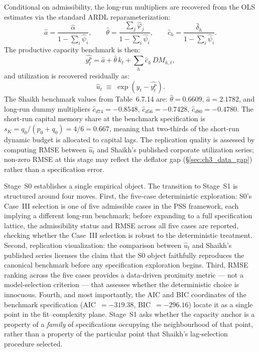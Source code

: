 \documentclass[11pt,a4paper]{article}
\begin{document}
Conditional on admissibility, the long-run multipliers are recovered from
the OLS estimates via the standard ARDL reparameterization:
%
\begin{equation}
	\label{eq:S0_lrmult}
	\hat{a} = \frac{\hat{\alpha}}{1 - \sum_i \hat{\psi}_i},
	\qquad
	\hat{\theta} = \frac{\sum_j \hat{\varphi}_j}{1 - \sum_i \hat{\psi}_i},
	\qquad
	\hat{c}_h = \frac{\hat{\delta}_h}{1 - \sum_i \hat{\psi}_i}.
\end{equation}
%
The productive capacity benchmark is then:
%
\begin{equation}
	\label{eq:S0_yp}
	\widehat{y_t^p}
	=
	\hat{a}
	+ \hat{\theta}\,k_t
	+ \sum_h \hat{c}_h\,DM_{h,t},
\end{equation}
%
and utilization is recovered residually as:
%
\begin{equation}
	\label{eq:S0_uhat}
	\widehat{u}_t
	\;\equiv\;
	\exp\!\left( y_t - \widehat{y_t^p} \right).
\end{equation}
%
The Shaikh benchmark values from Table~6.7.14 are: $\hat{\theta} = 0.6609$,
$\hat{a} = 2.1782$, and long-run dummy multipliers $\hat{c}_{d74} = -0.8548$,
$\hat{c}_{d56} = -0.7428$, $\hat{c}_{d80} = -0.4780$. The short-run capital
memory share at the benchmark specification is $s_K = q_0/(p_0 + q_0) =
4/6 = 0.667$, meaning that two-thirds of the short-run dynamic budget is
allocated to capital lags. The replication quality is assessed by computing
RMSE between $\widehat{u}_t$ and Shaikh's published corporate utilization
series; non-zero RMSE at this stage may reflect the deflator gap
(\S\ref{sec:ch3_data_gap}) rather than a specification error.


Stage~S0 establishes a single empirical object. The transition to Stage~S1
is structured around four moves. First, the five-case deterministic
exploration: S0's Case~III selection is one of five admissible cases in the
PSS framework, each implying a different long-run benchmark; before
expanding to a full specification lattice, the admissibility status and
RMSE across all five cases are reported, checking whether the Case~III
selection is robust to the deterministic treatment. Second, replication
visualization: the comparison between $\widehat{u}_t$ and Shaikh's
published series licenses the claim that the S0 object faithfully
reproduces the canonical benchmark before any specification exploration
begins. Third, RMSE ranking across the five cases provides a
data-driven proximity metric --- not a model-selection criterion --- that
assesses whether the deterministic choice is innocuous. Fourth, and most
importantly, the AIC and BIC coordinates of the benchmark specification
(AIC~$= -319.38$, BIC~$= -296.16$) locate it as a single point in the
fit--complexity plane. Stage~S1 asks whether the capacity anchor is a
property of a \emph{family} of specifications occupying the neighbourhood
of that point, rather than a property of the particular point that Shaikh's
lag-selection procedure selected.
\end{document}
